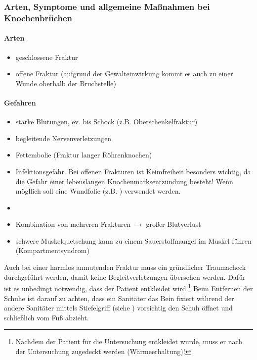 \subsubsection{Arten, Symptome und allgemeine Maßnahmen bei Knochenbrüchen}

\paragraph{Arten}
\begin{itemize}
  \item geschlossene Fraktur
  \item offene Fraktur (aufgrund der Gewalteinwirkung kommt es auch zu  einer
  Wunde oberhalb der Bruchstelle)
\end{itemize}



\paragraph{Gefahren}
\begin{itemize}
  \item starke Blutungen, ev. bis Schock (z.B. Oberschenkelfraktur)
  \item begleitende Nervenverletzungen
  \item Fettembolie (Fraktur langer Röhrenknochen)
  \item Infektionsgefahr. Bei offenen Frakturen ist Keimfreiheit be\-sonders 
  wichtig, da  die Gefahr einer lebenslangen Knochen\-marks\-ent\-zündung 
   besteht!
  Wenn mögllich soll eine Wundfolie (z.B.
  \texttrademark ) verwendet werden.    \item
  \item Kombination von mehreren Frakturen $\rightarrow$ großer Blutverlust
  \item schwere Muskelquetschung kann zu einem Sauerstoffmangel im Muskel 
  führen (Kompartmentsyndrom)
\end{itemize}

Auch bei einer harmlos anmutenden Fraktur muss ein gründlicher Traumacheck
durchgeführt werden, damit keine Begleitverletzungen übersehen werden. Dafür
ist es unbedingt notwendig, dass der Patient entkleidet wird.\footnote{Nachdem
der Patient für die Untersuchung entkleidet wurde, muss er nach der
Untersuchung zugedeckt werden (Wärmeerhaltung)!} Beim Entfernen der Schuhe ist
darauf zu achten, dass ein Sanitäter das Bein fixiert während der andere
Sanitäter mittels Stiefelgriff (siehe )
vorsichtig den Schuh öffnet und schließlich vom Fuß abzieht.

